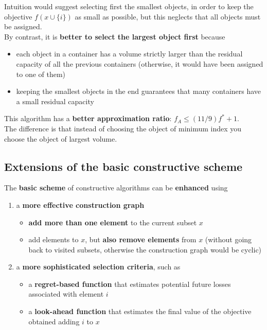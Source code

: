 Intuition would suggest selecting first the smallest objects, in order to keep the objective $f (x \cup \{i\})$ as small as possible, but this neglects that all objects must be assigned.\\

By contrast, it is \textbf{better to select the largest object first} because
\begin{itemize}
	\item each object in a container has a volume strictly larger than the residual capacity of all the previous containers (otherwise, it would have been assigned to one of them)
	\item keeping the smallest objects in the end guarantees that many containers have a small residual capacity
\end{itemize}
This algorithm has a \textbf{better approximation ratio}: $f_A \leq (11/9) f^\ast + 1$.\\

The difference is that instead of choosing the object of minimum index you choose the object of largest volume.\\


\newpage

\subsection{Extensions of the basic constructive scheme}
The \textbf{basic scheme} of constructive algorithms can be \textbf{enhanced} using
\begin{enumerate}
	\item a \textbf{more effective construction graph}
	\begin{itemize}
		\item \textbf{add more than one element} to the current subset $x$
		\item add elements to $x$, but \textbf{also remove elements} from $x$ (without going back to visited subsets, otherwise the construction graph would be cyclic)
	\end{itemize}
	\nn
	
	\item a \textbf{more sophisticated selection criteria}, such as
	\begin{itemize}
		\item a \textbf{regret-based function} that estimates potential future losses associated with element $i$
		\item a \textbf{look-ahead function} that estimates the final value of the objective obtained adding $i$ to $x$
	\end{itemize}
\end{enumerate}

